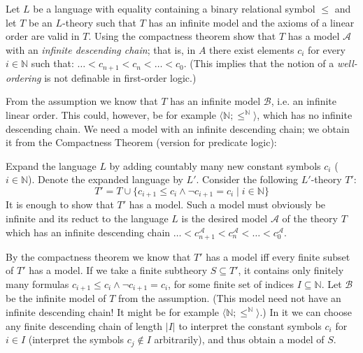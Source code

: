 \begin{problem} 
    
    Let $L$ be a language with equality containing a binary relational symbol $\le$ and let $T$ be an $L$-theory such that $T$ has an infinite model and the axioms of a linear order are valid in $T$. Using the compactness theorem show that $T$ has a model $\mathcal{A}$ with an \emph{infinite descending chain}; that is, in $A$ there exist elements $c_i$ for every $i\in \mathbb{N}$ such that: $\dots < c_{n+1} < c_n< \dots <c_0$.
    (This implies that the notion of a \emph{well-ordering} is not definable in first-order logic.)

    \begin{solution}

        From the assumption we know that $T$ has an infinite model $\mathcal B$, i.e. an infinite linear order. This could, however, be for example $\langle \mathbb N;\leq^\mathbb N\rangle$, which has no infinite descending chain. We need a model with an infinite descending chain; we obtain it from the Compactness Theorem (version for predicate logic):
                
        Expand the language $L$ by adding countably many new constant symbols $c_i$ ($i\in\mathbb{N}$). Denote the expanded language by $L'$. Consider the following $L'$-theory $T'$:
        $$
        T' = T \cup \{c_{i+1}\leq c_i\land\neg c_{i+1}=c_i\mid i\in\mathbb{N}\}
        $$
        It is enough to show that $T'$ has a model. Such a model must obviously be infinite and its reduct to the language $L$ is the desired model $\mathcal A$ of the theory $T$ which has an infinite descending chain $\dots < c_{n+1}^\mathcal A < c_n^\mathcal A < \dots < c_0^\mathcal A$. 
        
        By the compactness theorem we know that $T'$ has a model iff every finite subset of $T'$ has a model. If we take a finite subtheory $S\subseteq T'$, it contains only finitely many formulas $c_{i+1}\leq c_i\land\neg c_{i+1}=c_i$, for some finite set of indices $I\subseteq\mathbb N$. Let $\mathcal B$ be the infinite model of $T$ from the assumption. (This model need not have an infinite descending chain! It might be for example $\langle \mathbb N;\leq^\mathbb N\rangle$.) In it we can choose any finite descending chain of length $|I|$ to interpret the constant symbols $c_i$ for $i\in I$ (interpret the symbols $c_j\notin I$ arbitrarily), and thus obtain a model of $S$.
                    
    \end{solution}

\end{problem}



